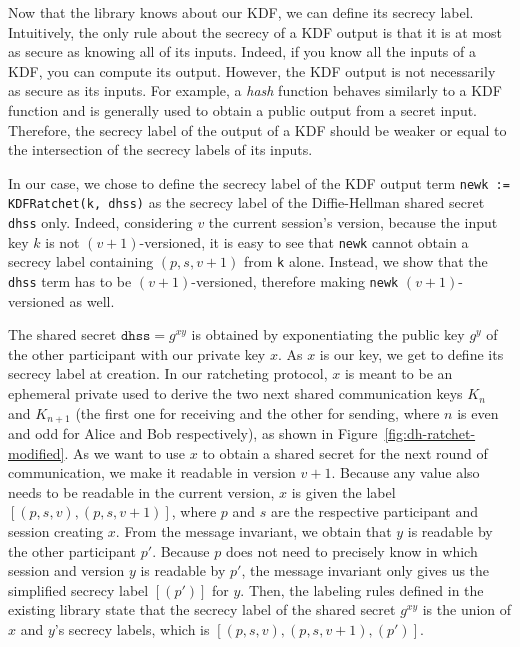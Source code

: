 Now that the library knows about our KDF, we can define its secrecy label.
Intuitively, the only rule about the secrecy of a KDF output is that it is at most as secure as knowing all of its inputs. Indeed, if you know all the inputs of a KDF, you can compute its output.
However, the KDF output is not necessarily as secure as its inputs. For example, a \emph{hash} function behaves similarly to a KDF function and is generally used to obtain a public output from a secret input. 
Therefore, the secrecy label of the output of a KDF should be weaker or equal to the intersection of the secrecy labels of its inputs.

In our case, we chose to define the secrecy label of the KDF output term \texttt{newk~:= KDFRatchet(k, dhss)} as the secrecy label of the Diffie-Hellman shared secret \texttt{dhss} only.
Indeed, considering $v$ the current session's version, because the input key $k$ is not $(v+1)$-versioned, it is easy to see that \texttt{newk} cannot obtain a secrecy label containing $(p,s,v+1)$ from \texttt{k} alone.
Instead, we show that the \texttt{dhss} term has to be $(v+1)$-versioned, therefore making \texttt{newk} $(v+1)$-versioned as well.

The shared secret $\texttt{dhss} = g^{xy}$ is obtained by exponentiating the public key $g^y$ of the other participant with our private key $x$.
As $x$ is our key, we get to define its secrecy label at creation. 
In our ratcheting protocol, $x$ is meant to be an ephemeral private used to derive the two next shared communication keys $K_n$ and $K_{n+1}$ (the first one for receiving and the other for sending, where $n$ is even and odd for Alice and Bob respectively), as shown in Figure~\ref{fig:dh-ratchet-modified}.
As we want to use $x$ to obtain a shared secret for the next round of communication, we make it readable in version $v+1$. Because any value also needs to be readable in the current version, $x$ is given the label $[(p,s,v),(p,s,v+1)]$, where $p$ and $s$ are the respective participant and session creating $x$.
From the message invariant, we obtain that $y$ is readable by the other participant $p'$. Because $p$ does not need to precisely know in which session and version $y$ is readable by $p'$, the message invariant only gives us the simplified secrecy label $[(p')]$ for $y$.
Then, the labeling rules defined in the existing library state that the secrecy label of the shared secret $g^{xy}$ is the union of $x$ and $y$'s secrecy labels, which is $[(p,s,v),(p,s,v+1),(p')]$.

